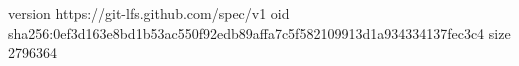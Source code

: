 version https://git-lfs.github.com/spec/v1
oid sha256:0ef3d163e8bd1b53ac550f92edb89affa7c5f582109913d1a934334137fec3c4
size 2796364
